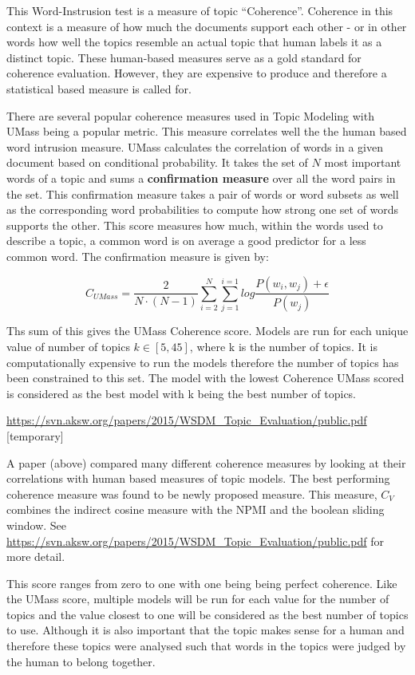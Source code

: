 \documentclass[
]{article}
\begin{document}
This Word-Instrusion test is a measure of topic ``Coherence''. Coherence
in this context is a measure of how much the documents support each
other - or in other words how well the topics resemble an actual topic
that human labels it as a distinct topic. These human-based measures
serve as a gold standard for coherence evaluation. However, they are
expensive to produce and therefore a statistical based measure is called
for.

There are several popular coherence measures used in Topic Modeling with
UMass being a popular metric. This measure correlates well the the human
based word intrusion measure. UMass calculates the correlation of words
in a given document based on conditional probability. It takes the set
of \(N\) most important words of a topic and sums a \textbf{confirmation
measure} over all the word pairs in the set. This confirmation measure
takes a pair of words or word subsets as well as the corresponding word
probabilities to compute how strong one set of words supports the other.
This score measures how much, within the words used to describe a topic,
a common word is on average a good predictor for a less common word. The
confirmation measure is given by:

\begin{equation}
C_{UMass} = \frac{2}{N\cdot(N-1) } \sum_{i=2}^{N}\sum_{j=1}^{i=1}log\frac{P(w_i,w_j)+\epsilon }{P(w_j)}
\end{equation}

Ths sum of this gives the UMass Coherence score. Models are run for each
unique value of number of topics \(k\in[5,45]\), where k is the number
of topics. It is computationally expensive to run the models therefore
the number of topics has been constrained to this set. The model with
the lowest Coherence UMass scored is considered as the best model with k
being the best number of topics.

\url{https://svn.aksw.org/papers/2015/WSDM_Topic_Evaluation/public.pdf}
{[}temporary{]}

A paper (above) compared many different coherence measures by looking at
their correlations with human based measures of topic models. The best
performing coherence measure was found to be newly proposed measure.
This measure, \(C_V\) combines the indirect cosine measure with the NPMI
and the boolean sliding window. See
\url{https://svn.aksw.org/papers/2015/WSDM_Topic_Evaluation/public.pdf}
for more detail.

This score ranges from zero to one with one being being perfect
coherence. Like the UMass score, multiple models will be run for each
value for the number of topics and the value closest to one will be
considered as the best number of topics to use. Although it is also
important that the topic makes sense for a human and therefore these
topics were analysed such that words in the topics were judged by the
human to belong together.
\end{document}
